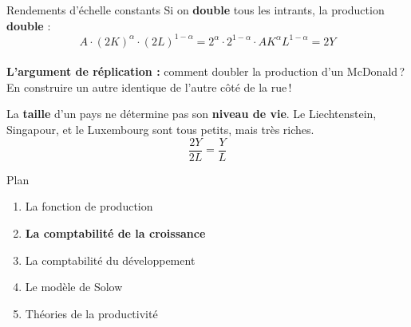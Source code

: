 \documentclass[aspectratio=169]{beamer}
\begin{document}
\begin{frame}[t]{Rendements d'échelle constants}\examtag
   Si on \textbf{double} tous les intrants, la production \textbf{double} :
   \vspace{0.1cm}
   \begin{equation*}
      A \cdot (2K)^{\alpha} \cdot (2L)^{1-\alpha} = 2^{\alpha} \cdot 2^{1-\alpha} \cdot A K^{\alpha} L^{1-\alpha} = 2Y
   \end{equation*}
   \\ \vspace{0.2cm}
   \textbf{L'argument de réplication :} comment doubler la production d'un McDonald\,? En construire un autre identique de l'autre côté de la rue\,!
   \vspace{0.2cm}
   \begin{keyinsight}
      La \textbf{taille} d'un pays ne détermine pas son \textbf{niveau de vie}. Le Liechtenstein, Singapour, et le Luxembourg sont tous petits, mais très riches.
      \begin{equation*}
         \frac{2 Y}{2 L} = \frac{Y}{L}
      \end{equation*}
   \end{keyinsight}
\end{frame}

\begin{frame}{Plan}
   \begin{enumerate}
      \setlength\itemsep{0.3cm}
      \item {\color{gray!50}La fonction de production}
      \item \textbf{La comptabilité de la croissance}
      \item La comptabilité du développement
      \item Le modèle de Solow
      \item Théories de la productivité
   \end{enumerate}
\end{frame}

\end{document}
